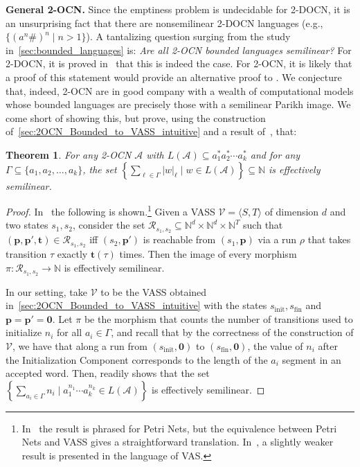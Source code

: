 \documentclass[11pt,a4paper]{amsart}
\newtheorem{theorem}{Theorem}
\theoremstyle{definition}
\newcommand{\tup}[1]{\langle #1 \rangle}
\renewcommand{\vec}[1]{\boldsymbol{#1}}
\newcommand{\bbN}{\mathbb{N}}
\newcommand{\cA}{\mathcal{A}}
\newcommand{\cV}{\mathcal{V}}
\newcommand{\cR}{\mathcal{R}}
\newcommand{\mysubparagraph}[1]{\noindent \textbf{\textsf{#1}} }
\begin{document}
\mysubparagraph{General 2-OCN.}  Since the emptiness problem is undecidable for
2-DOCN, it is an unsurprising fact that there are nonsemilinear 2-DOCN languages
(e.g., \(\{(a^n\#)^n \mid n > 1\}\)).  A tantalizing question surging from the study in~\cref{sec:bounded_languages} is: \emph{Are all 2-OCN bounded languages semilinear?}  
For 2-DOCN, it is proved in~\cite{miyano1982two} that this is indeed the case. For 2-OCN, it is likely that a proof of this statement would provide an alternative proof to .  We conjecture that, indeed, 2-OCN
are in good company with a wealth of computational models whose bounded
languages are precisely those with a semilinear Parikh image.  We come short of
showing this, but prove, using the construction
of~\cref{sec:2OCN_Bounded_to_VASS_intuitive} and a result
of~\cite{hauschildt1994petri}, that:
\begin{theorem}
	\label{thm:singleton_alphabet_semilinear} For any 2-OCN $\cA$ with \(L(\cA) \subseteq
	a_1^*a_2^*\cdots a_k^*\) and for any \(\Gamma \subseteq \{a_1, a_2, \ldots, a_k\}\), the set $\left\{ \sum_{\ell \in \Gamma}
	|w|_\ell \mid w \in L(\cA)\right\}\subseteq \bbN$ is effectively semilinear.
\end{theorem}
\begin{proof} In~\cite[Corollary 4.3]{hauschildt1994petri} the following is
	shown.\footnote{In~\cite{hauschildt1994petri} the result is phrased for Petri
		Nets, but the equivalence between Petri Nets and VASS gives a straightforward
		translation.  In~\cite{kleinebuning1989}, a slightly weaker result is
		presented in the language of VAS.} Given a VASS $\cV=\tup{S,T}$ of dimension
	$d$ and two states $s_1,s_2$, consider the set $\cR_{s_1,s_2}\subseteq \bbN^d\times \bbN^d\times
	\bbN^T$ such that $(\vec{p},\vec{p'},\vec{t})\in \cR_{s_1,s_2}$ iff
	$(s_2,\vec{p'})$ is reachable from $(s_1,\vec{p})$ via a run $\rho$ that takes
	transition $\tau$ exactly $\vec{t}(\tau)$ times. Then the image of every morphism
	$\pi\colon \cR_{s_1,s_2}\to \bbN$ is effectively semilinear.
	
	In our setting, take $\cV$ to be the VASS obtained
	in~\cref{sec:2OCN_Bounded_to_VASS_intuitive} with the states
	$s_{\textrm{init}}, s_{\textrm{fin}}$ and $\vec{p}=\vec{p'}=\vec{0}$. Let
	$\pi$ be the morphism that counts the number of transitions used to initialize
	$n_i$ for all $a_i \in \Gamma$, and recall that by the correctness of the
	construction of $\cV$, we have that along a run from
	$(s_{\textrm{init}},\vec{0})$ to $(s_{\textrm{fin}},\vec{0})$, the value of
	$n_i$ after the Initialization Component corresponds to the length of the
	$a_i$ segment in an accepted word.  Then, \cite[Corollary
	4.3]{hauschildt1994petri} readily shows that the set
	$\left\{\sum_{a_i \in \Gamma} n_i \mid a_1^{n_1}\cdots a_k^{n_k}\in L(\cA)\right\}$ is effectively
	semilinear.
\end{proof}
\end{document}
